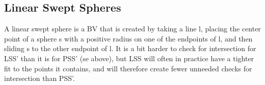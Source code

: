 \subsection{Linear Swept Spheres}
A linear swept sphere is a BV that is created by taking a line l, placing the center point of a sphere s with a positive radius on one of the endpoints of l, and then sliding s to the other endpoint of l. It is a bit harder to check for intersection for LSS' than it is for PSS' (se above), but LSS will often in practice have a tighter fit to the points it contains, and will therefore create fewer unneeded checks for intersection than PSS'.
